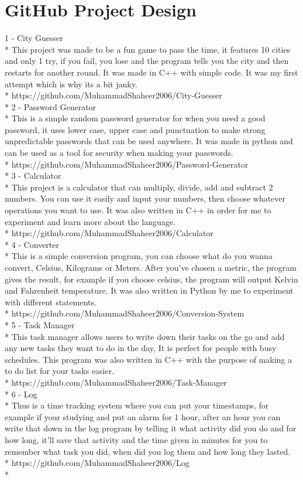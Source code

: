 \documentclass{turabian}
\begin{document}
\section{\large GitHub Project Design}
{\Large 1 - City Guesser}\\*
This project was made to be a fun game to pass the time, it features 10 cities and only 1 try, if you fail, you lose and the program tells you the city and then restarts for another round. It was made in C++ with simple code. It was my first attempt which is why its a bit janky.\\*
https://github.com/MuhammadShaheer2006/City-Guesser\\*
{\Large 2 - Password Generator}\\*
This is a simple random password generator for when you need a good password, it uses lower case, upper case and punctuation to make strong unpredictable passwords that can be used anywhere. It was made in python and can be used as a tool for security when making your passwords.\\*
https://github.com/MuhammadShaheer2006/Password-Generator\\*
{\Large 3 - Calculator}\\*
This project is a calculator that can multiply, divide, add and subtract 2 numbers. You can use it easily and input your numbers, then choose whatever operations you want to use. It was also written in C++ in order for me to experiment and learn more about the language.\\*
https://github.com/MuhammadShaheer2006/Calculator\\*
{\Large 4 - Converter}\\*
This is a simple conversion program, you can choose what do you wanna convert, Celsius, Kilograms or Meters. After you've chosen a metric, the program gives the result, for example if you choose celsius, the program will output Kelvin and Fahrenheit temperature. It was also written in Python by me to experiment with different statements.\\*
https://github.com/MuhammadShaheer2006/Conversion-System\\*
{\Large 5 - Task Manager}\\*
This task manager allows users to write down their tasks on the go and add any new tasks they want to do in the day, It is perfect for people with busy schedules. This program was also written in C++ with the purpose of making a to do list for your tasks easier.\\*
https://github.com/MuhammadShaheer2006/Task-Manager\\*
{\Large 6 - Log}\\*
Thus is a time tracking system where you can put your timestamps, for example if your studying and put an alarm for 1 hour, after an hour you can write that down in the log program by telling it what activity did you do and for how long, it'll save that activity and the time given in minutes for you to remember what task you did, when did you log them and how long they lasted.\\*
https://github.com/MuhammadShaheer2006/Log\\*
\end{document}
